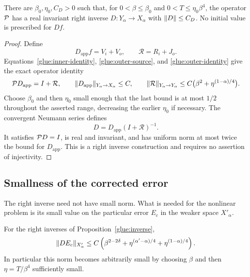 \begin{proposition}\label{glue:inverse}
There are $\beta_0,\eta_0,C_D>0$ such that, for
$0<\beta\le\beta_0$ and $0<T\le\eta_0\beta^4$, the operator
$\mathcal P$ has a real invariant right inverse
$D:Y_\alpha\to X_\alpha$ with $\lVert D\rVert\le C_D$.
No initial value is prescribed for $Df$.
\end{proposition}

\begin{proof}
Define
\[
 D_{\mathrm{app}}f=V_i+V_o,\qquad \mathcal R=R_i+J_o.
\]
Equations~\eqref{glue:inner-identity}, \eqref{glue:outer-source}, and
\eqref{glue:outer-identity} give the exact operator identity
\begin{equation}\label{glue:parametrix}
 \mathcal P D_{\mathrm{app}}=I+\mathcal R,\qquad
 \lVert D_{\mathrm{app}}\rVert_{Y_\alpha\to X_\alpha}\le C,\qquad
 \lVert \mathcal R\rVert_{Y_\alpha\to Y_\alpha}
 \le C\bigl(\beta^2+\eta^{(1-\alpha)/4}\bigr).
\end{equation}
Choose $\beta_0$ and then $\eta_0$ small enough that the last bound is
at most $1/2$ throughout the asserted range, decreasing the earlier
$\eta_0$ if necessary.  The convergent Neumann series defines
\begin{equation}\label{glue:neumann}
 D=D_{\mathrm{app}}(I+\mathcal R)^{-1}.
\end{equation}
It satisfies $\mathcal P D=I$, is real and invariant, and has uniform norm
at most twice the bound for $D_{\mathrm{app}}$.  This is a right inverse
construction and requires no assertion of injectivity.
\end{proof}

\subsection{Smallness of the corrected error}

The right inverse need not have small norm.  What is needed for the
nonlinear problem is its small value on the particular error $E_c$ in
the weaker space $X'_\alpha$.

\begin{lemma}\label{glue:special-error}
For the right inverses of Proposition~\ref{glue:inverse},
\begin{equation}\label{glue:DE-small}
 \lVert DE_c\rVert_{X'_\alpha}
 \le C\left(\beta^{2-2\delta}
       +\eta^{(\alpha'-\alpha)/4}
       +\eta^{(1-\alpha)/4}\right).
\end{equation}
In particular this norm becomes arbitrarily small by choosing $\beta$
and then $\eta=T/\beta^4$ sufficiently small.
\end{lemma}

